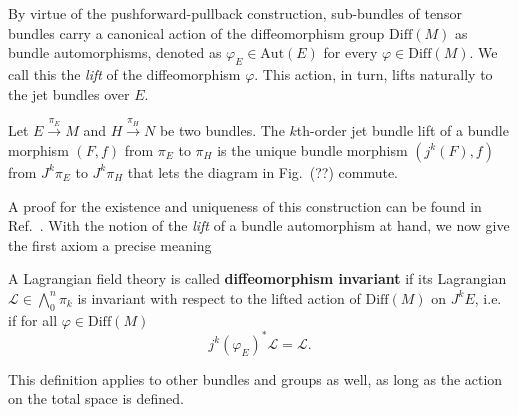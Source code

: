 By virtue of the pushforward-pullback construction, sub-bundles of tensor bundles carry a canonical action of the diffeomorphism group $\mathrm{Diff}(M)$ as bundle automorphisms, denoted as $\varphi_E\in \mathrm{Aut}(E)$ for every $\varphi\in\mathrm{Diff}(M)$. We call this the \emph{lift} of the diffeomorphism $\varphi$. This action, in turn, lifts naturally to the jet bundles over $E$.

\begin{definition}
  Let $E \overset{\pi_E}{\longrightarrow} M$ and $H \overset{\pi_H}{\longrightarrow} N$ be two bundles. The $k$th-order jet bundle lift of a bundle morphism $(F,f)$ from $\pi_E$ to $\pi_H$ is the unique bundle morphism $(j^k(F),f)$ from $J^k\pi_E$ to $J^k\pi_H$ that lets the diagram in Fig.~(??) commute.
\end{definition}
A proof for the existence and uniqueness of this construction can be found in Ref.~\cite{saunders}. With the notion of the \emph{lift} of a bundle automorphism at hand, we now give the first axiom a precise meaning
\begin{definition}
  A Lagrangian field theory is called \textbf{diffeomorphism invariant} if its Lagrangian $\mathcal L\in\textstyle\bigwedge_0^n\pi_k$ is invariant with respect to the lifted action of $\mathrm{Diff}(M)$ on $J^kE$, i.e.~ if for all $\varphi\in\mathrm{Diff}(M)$
  \begin{equation}\label{lagrangian_diffeo_invariance}
    j^k(\varphi_E)^\ast \mathcal L = \mathcal L.
  \end{equation}
\end{definition}
This definition applies to other bundles and groups as well, as long as the action on the total space is defined.

